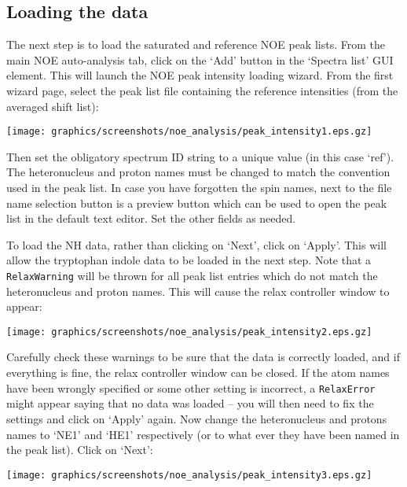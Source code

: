 \subsection{Loading the data}

The next step is to load the saturated and reference NOE peak lists.  From the main NOE auto-analysis tab, click on the `Add' button in the `Spectra list' GUI element.  This will launch the NOE peak intensity loading wizard.  From the first wizard page, select the peak list file containing the reference intensities (from the averaged shift list):

\begin{minipage}[h]{\linewidth}
\centerline{\texttt{[image: graphics/screenshots/noe\_analysis/peak\_intensity1.eps.gz]}}
\end{minipage}

Then set the obligatory spectrum ID string to a unique value (in this case `ref').  The heteronucleus and proton names must be changed to match the convention used in the peak list.  In case you have forgotten the spin names, next to the file name selection button is a preview button which can be used to open the peak list in the default text editor.  Set the other fields as needed.

To load the NH data, rather than clicking on `Next', click on `Apply'.  This will allow the tryptophan indole data to be loaded in the next step.  Note that a \texttt{RelaxWarning} will be thrown for all peak list entries which do not match the heteronucleus and proton names.  This will cause the relax controller window to appear:

\begin{minipage}[h]{\linewidth}
\centerline{\texttt{[image: graphics/screenshots/noe\_analysis/peak\_intensity2.eps.gz]}}
\end{minipage}

Carefully check these warnings to be sure that the data is correctly loaded, and if everything is fine, the relax controller window can be closed.  If the atom names have been wrongly specified or some other setting is incorrect, a \texttt{RelaxError} might appear saying that no data was loaded -- you will then need to fix the settings and click on `Apply' again.  Now change the heteronucleus and protons names to `NE1' and `HE1' respectively (or to what ever they have been named in the peak list).  Click on `Next':

\begin{minipage}[h]{\linewidth}
\centerline{\texttt{[image: graphics/screenshots/noe\_analysis/peak\_intensity3.eps.gz]}}
\end{minipage}

